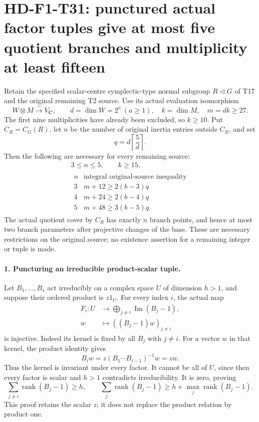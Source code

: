 \section[HD-F1-T31: at most five symplectic quotient branches]{HD-F1-T31: punctured actual factor tuples give at most five quotient branches and multiplicity at least fifteen}
\label{sec:f1-symplectic-punctured-tuples}

Retain the specified scalar-centre symplectic-type normal subgroup
\(R\lhd G\) of T17 and the original remaining T2 source.
Use its actual evaluation isomorphism
\[
 W\otimes M\xrightarrow{\sim}V_{\mathbf C},\qquad
 d=\dim W=2^a\ (a\ge1),\quad k=\dim M,\quad m=dk\ge27.
 \tag{F1T31.1}
\]
The first nine multiplicities have already been excluded, so
\(k\ge10\). Put \(C_R=C_G(R)\), let \(n\) be the number
of original inertia entries outside \(C_R\), and set
\[
 q=d\left\lceil\frac5d\right\rceil.
 \tag{F1T31.2}
\]
Then the following are necessary for every remaining source:
\[
 \begin{gathered}
                    3\le n\le5,\qquad k\ge15,\\
 \begin{array}{c|c}
 n&\text{integral original-source inequality}\\ \hline
 3&m+12\ge2(b-3)q\\
 4&m+24\ge2(b-4)q\\
 5&m+48\ge3(b-5)q.
 \end{array}
 \end{gathered}
 \tag{F1T31.3}
\]
The actual quotient cover by \(C_R\) has exactly \(n\)
branch points, and hence at most two branch parameters after
projective changes of the base. These are necessary restrictions
on the original source; no existence assertion for a remaining
integer or tuple is made.

\paragraph{1. Puncturing an irreducible product-scalar tuple.}
Let \(B_1,\ldots,B_s\) act irreducibly on a complex space
\(U\) of dimension \(h>1\), and suppose their ordered
product is \(z1_U\). For every index \(i\), the actual map
\[
 \begin{split}
 F_i:U&\longrightarrow\bigoplus_{j\ne i}\operatorname{Im}(B_j-1),\\
 w&\longmapsto((B_j-1)w)_{j\ne i}
 \end{split}
 \tag{F1T31.4}
\]
is injective. Indeed its kernel is fixed by all \(B_j\)
with \(j\ne i\). For a vector \(w\) in that kernel,
the product identity gives
\[
 B_iw=z(B_1\cdots B_{i-1})^{-1}w=zw.
\]
Thus the kernel is invariant under every factor. It cannot
be all of \(U\), since then every factor is scalar and
\(h>1\) contradicts irreducibility. It is zero, proving
\[
 \sum_{j\ne i}\operatorname{rank}(B_j-1)\ge h,
 \qquad
 \sum_j\operatorname{rank}(B_j-1)
          \ge h+\max_j\operatorname{rank}(B_j-1).
 \tag{F1T31.5}
\]
This proof retains the scalar \(z\); it does not replace
the product relation by product one.

